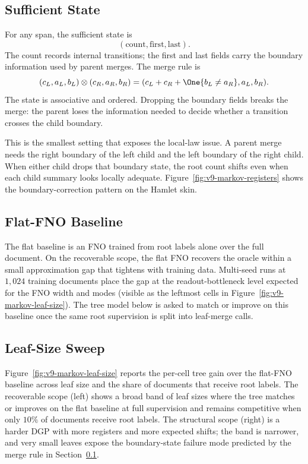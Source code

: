 \subsection{Sufficient State}\label{app:v9-markov-state}

For any span, the sufficient state is
\[
(\mathrm{count},\mathrm{first},\mathrm{last}).
\]
The count records internal transitions; the first and last fields
carry the boundary information used by parent merges. The merge rule
is
\[
(c_L,a_L,b_L)\otimes(c_R,a_R,b_R)
=
(c_L+c_R+\One\{b_L\ne a_R\},a_L,b_R).
\]
The state is associative and ordered. Dropping the boundary fields
breaks the merge: the parent loses the information needed to decide
whether a transition crosses the child boundary.

This is the smallest setting that exposes the local-law issue. A
parent merge needs the right boundary of the left child and the left
boundary of the right child. When either child drops that boundary
state, the root count shifts even when each child summary looks
locally adequate. Figure~\ref{fig:v9-markov-registers} shows the
boundary-correction pattern on the Hamlet skin.

\subsection{Flat-FNO Baseline}\label{app:v9-markov-fno}

The flat baseline is an FNO trained from root labels alone over the
full document. On the recoverable scope, the flat FNO recovers the
oracle within a small approximation gap that tightens with training
data. Multi-seed runs at $1{,}024$ training documents place the gap
at the readout-bottleneck level expected for the FNO width and modes
(visible as the leftmost cells in
Figure~\ref{fig:v9-markov-leaf-size}). The tree model below is asked
to match or improve on this baseline once the same root supervision
is split into leaf-merge calls.

\subsection{Leaf-Size Sweep}\label{app:v9-markov-leaf-size}

Figure~\ref{fig:v9-markov-leaf-size} reports the per-cell tree
gain over the flat-FNO baseline across leaf size and the share of
documents that receive root labels. The recoverable scope (left)
shows a broad band of leaf sizes where the tree matches or improves
on the flat baseline at full supervision and remains competitive when
only $10\%$ of documents receive root labels. The structural scope
(right) is a harder DGP with more registers and more expected shifts;
the band is narrower, and very small leaves expose the
boundary-state failure mode predicted by the merge rule in
Section~\ref{app:v9-markov-state}.

